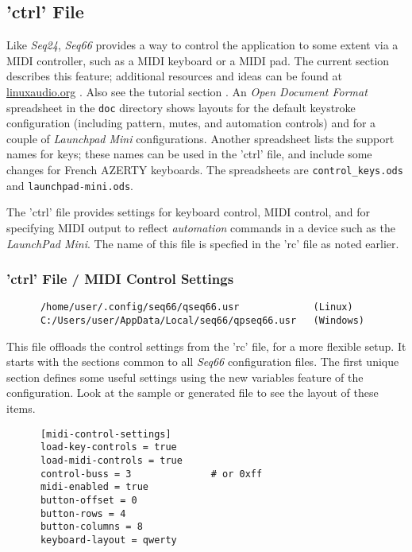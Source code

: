 \subsection{'ctrl' File}
\label{subsec:configuration_ctrl}

   Like \textsl{Seq24}, \textsl{Seq66} provides a way to control the
   application to some extent via a MIDI controller, such as a MIDI keyboard or
   a MIDI pad.  The current section describes this feature;
   additional resources and ideas can be found at \url{linuxaudio.org}
   \cite{midicontrol}.
   Also see the tutorial section .
   An \textsl{Open Document Format} spreadsheet in the
   \texttt{doc} directory shows layouts for the default
   keystroke configuration (including pattern, mutes, and automation controls)
   and for a couple of \textsl{Launchpad Mini} configurations.
   Another spreadsheet lists the support names for keys; these names can be used
   in the 'ctrl' file, and include some changes for French AZERTY keyboards.
   The spreadsheets are
   \texttt{control\_keys.ods} and
   \texttt{launchpad-mini.ods}.

   The 'ctrl' file provides settings for keyboard control, MIDI control, and
   for specifying MIDI output to reflect \textsl{automation} commands in a
   device such as the \textsl{LaunchPad Mini}.  The name of this file is
   specfied in the 'rc' file as noted earlier.

\subsubsection{'ctrl' File / MIDI Control Settings}
\label{subsubsec:configuration_ctrl_midi_control_settings}

   \begin{verbatim}
      /home/user/.config/seq66/qseq66.usr             (Linux)
      C:/Users/user/AppData/Local/seq66/qpseq66.usr   (Windows)
   \end{verbatim}

   This file offloads the control settings from the 'rc' file, for a more
   flexible setup. It starts with the sections common to all \textsl{Seq66}
   configuration files.  The first unique section defines some useful settings
   using the new variables feature of the configuration.  Look at the sample or
   generated file to see the layout of these items.

   \begin{verbatim}
      [midi-control-settings]
      load-key-controls = true
      load-midi-controls = true
      control-buss = 3              # or 0xff
      midi-enabled = true
      button-offset = 0
      button-rows = 4
      button-columns = 8
      keyboard-layout = qwerty
   \end{verbatim}

